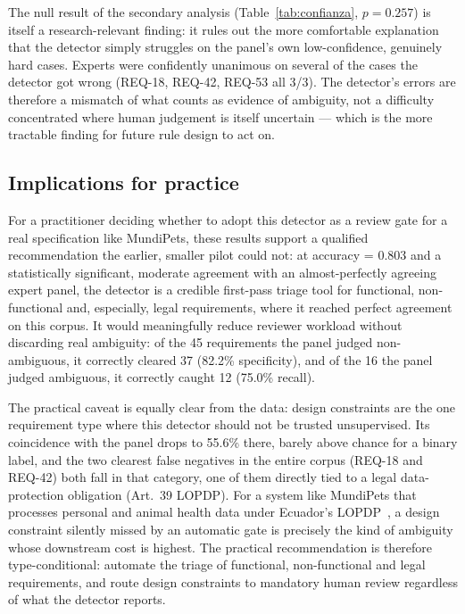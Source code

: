 \documentclass[pdflatex,sn-mathphys-num]{sn-jnl}
\theoremstyle{thmstyleone}%
\theoremstyle{thmstyletwo}%
\theoremstyle{thmstylethree}%
\begin{document}
	The null result of the secondary analysis (Table~\ref{tab:confianza}, $p=0.257$)
	is itself a research-relevant finding: it rules out the more comfortable
	explanation that the detector simply struggles on the panel's own
	low-confidence, genuinely hard cases. Experts were confidently unanimous on
	several of the cases the detector got wrong (REQ-18, REQ-42, REQ-53 all 3/3).
	The detector's errors are therefore a mismatch of what counts as evidence of
	ambiguity, not a difficulty concentrated where human judgement is itself
	uncertain --- which is the more tractable finding for future rule design to act
	on.
	
	\subsection{Implications for practice}\label{subsec:disc-practice}
	
	For a practitioner deciding whether to adopt this detector as a review gate for
	a real specification like MundiPets, these results support a qualified
	recommendation the earlier, smaller pilot could not: at accuracy = 0.803 and a
	statistically significant, moderate agreement with an almost-perfectly
	agreeing expert panel, the detector is a credible first-pass triage tool for
	functional, non-functional and, especially, legal requirements, where it
	reached perfect agreement on this corpus. It would meaningfully reduce reviewer
	workload without discarding real ambiguity: of the 45 requirements the panel
	judged non-ambiguous, it correctly cleared 37 (82.2\% specificity), and of the
	16 the panel judged ambiguous, it correctly caught 12 (75.0\% recall).
	
	The practical caveat is equally clear from the data: design constraints are the
	one requirement type where this detector should not be trusted unsupervised.
	Its coincidence with the panel drops to 55.6\% there, barely above chance for a
	binary label, and the two clearest false negatives in the entire corpus (REQ-18
	and REQ-42) both fall in that category, one of them directly tied to a legal
	data-protection obligation (Art.\ 39 LOPDP). For a system like MundiPets that
	processes personal and animal health data under Ecuador's
	LOPDP~\cite{lopdp2021}, a design constraint silently missed by an automatic
	gate is precisely the kind of ambiguity whose downstream cost is highest. The
	practical recommendation is therefore type-conditional: automate the triage of
	functional, non-functional and legal requirements, and route design
	constraints to mandatory human review regardless of what the detector reports.
	
\end{document}
